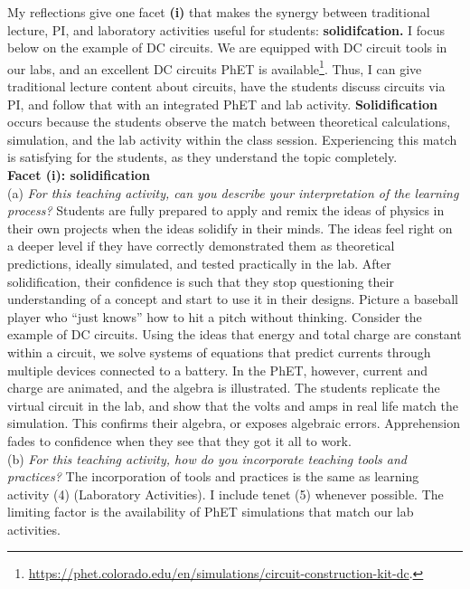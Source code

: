 \documentclass[../../../main.tex]{subfiles}
\begin{document}
My reflections give one facet \textbf{(i)} that makes the synergy between traditional lecture, PI, and laboratory activities useful for students: \textbf{solidifcation.}  I focus below on the example of DC circuits.  We are equipped with DC circuit tools in our labs, and an excellent DC circuits PhET is available\footnote{\url{https://phet.colorado.edu/en/simulations/circuit-construction-kit-dc}.}.  Thus, I can give traditional lecture content about circuits, have the students discuss circuits via PI, and follow that with an integrated PhET and lab activity.  \textbf{Solidification} occurs because the students observe the match between theoretical calculations, simulation, and the lab activity within the class session.  Experiencing this match is satisfying for the students, as they understand the topic completely.
\\
\vspace{0.15cm}
\textbf{Facet (i): solidification}
\\
\vspace{0.15cm}
(a) \textit{For this teaching activity, can you describe your interpretation of the learning process?}  Students are fully prepared to apply and remix the ideas of physics in their own projects when the ideas solidify in their minds.  The ideas feel right on a deeper level if they have correctly demonstrated them as theoretical predictions, ideally simulated, and tested practically in the lab.  After solidification, their confidence is such that they stop questioning their understanding of a concept and start to use it in their designs.  Picture a baseball player who ``just knows'' how to hit a pitch without thinking.  Consider the example of DC circuits.  Using the ideas that energy and total charge are constant within a circuit, we solve systems of equations that predict currents through multiple devices connected to a battery.  In the PhET, however, current and charge are animated, and the algebra is illustrated.  The students replicate the virtual circuit in the lab, and show that the volts and amps in real life match the simulation.  This confirms their algebra, or exposes algebraic errors.  Apprehension fades to confidence when they see that they got it all to work.
\\
\vspace{0.15cm}
(b) \textit{For this teaching activity, how do you incorporate teaching tools and practices?}  The incorporation of tools and practices is the same as learning activity (4) (Laboratory Activities).  I include tenet (5) whenever possible.  The limiting factor is the availability of PhET simulations that match our lab activities.
\end{document}
